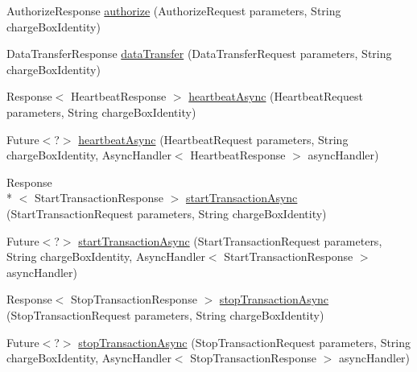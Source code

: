 \begin{DoxyCompactItemize}
\item 
Authorize\-Response \hyperlink{classde_1_1rwth_1_1idsg_1_1steve_1_1ocpp_1_1soap_1_1_central_system_service15___soap_server_a21da1255dbb4eb83e67ad64b18e4c0ac}{authorize} (Authorize\-Request parameters, String charge\-Box\-Identity)
\item 
Data\-Transfer\-Response \hyperlink{classde_1_1rwth_1_1idsg_1_1steve_1_1ocpp_1_1soap_1_1_central_system_service15___soap_server_a19897e3c43dc68b29cb94a720b4c9e30}{data\-Transfer} (Data\-Transfer\-Request parameters, String charge\-Box\-Identity)
\item 
Response$<$ Heartbeat\-Response $>$ \hyperlink{classde_1_1rwth_1_1idsg_1_1steve_1_1ocpp_1_1soap_1_1_central_system_service15___soap_server_a9aa428e1cc7a57365e433b29c8a6e9eb}{heartbeat\-Async} (Heartbeat\-Request parameters, String charge\-Box\-Identity)
\item 
Future$<$?$>$ \hyperlink{classde_1_1rwth_1_1idsg_1_1steve_1_1ocpp_1_1soap_1_1_central_system_service15___soap_server_a8f3c1c6cb7390f1fb2b2254ed636d737}{heartbeat\-Async} (Heartbeat\-Request parameters, String charge\-Box\-Identity, Async\-Handler$<$ Heartbeat\-Response $>$ async\-Handler)
\item 
Response\\*
$<$ Start\-Transaction\-Response $>$ \hyperlink{classde_1_1rwth_1_1idsg_1_1steve_1_1ocpp_1_1soap_1_1_central_system_service15___soap_server_a1ea56ec544b7c5368dc52235bb6c9a65}{start\-Transaction\-Async} (Start\-Transaction\-Request parameters, String charge\-Box\-Identity)
\item 
Future$<$?$>$ \hyperlink{classde_1_1rwth_1_1idsg_1_1steve_1_1ocpp_1_1soap_1_1_central_system_service15___soap_server_a295a6e2b6222739777e0fb5f6c8bc3a6}{start\-Transaction\-Async} (Start\-Transaction\-Request parameters, String charge\-Box\-Identity, Async\-Handler$<$ Start\-Transaction\-Response $>$ async\-Handler)
\item 
Response$<$ Stop\-Transaction\-Response $>$ \hyperlink{classde_1_1rwth_1_1idsg_1_1steve_1_1ocpp_1_1soap_1_1_central_system_service15___soap_server_a64d802221fedd325e609a1a4f995c4d9}{stop\-Transaction\-Async} (Stop\-Transaction\-Request parameters, String charge\-Box\-Identity)
\item 
Future$<$?$>$ \hyperlink{classde_1_1rwth_1_1idsg_1_1steve_1_1ocpp_1_1soap_1_1_central_system_service15___soap_server_afde91df27f1cf50165c6059851b2ebd0}{stop\-Transaction\-Async} (Stop\-Transaction\-Request parameters, String charge\-Box\-Identity, Async\-Handler$<$ Stop\-Transaction\-Response $>$ async\-Handler)

\end{DoxyCompactItemize}
